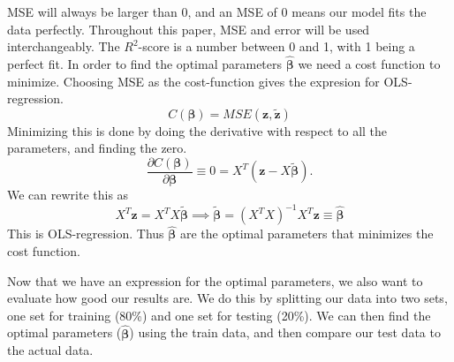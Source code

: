 \documentclass[reprint,english,notitlepage,aps,nobalancelastpage,nofootinbib]{revtex4-1}  %
\newcommand{\vc}[1]{\mathbf{#1}}
\begin{document}
MSE will always be larger than 0, and an MSE of 0 means our model fits the data perfectly. Throughout this paper, MSE and error will be used interchangeably. The $R^2$-score is a number between 0 and 1, with 1 being a perfect fit. In order to find the optimal parameters $\boldsymbol{\hat{\beta}}$ we need a cost function to minimize. Choosing MSE as the cost-function gives the expresion for OLS-regression.
\begin{equation*}
	C(\boldsymbol{\beta}) = MSE(\boldsymbol{z}, \boldsymbol{\tilde{z}})
\end{equation*}
Minimizing this is done by doing the derivative with respect to all the parameters, and finding the zero.
\begin{equation}\label{eq:Const_OLS}
	\frac{\partial C(\boldsymbol{\beta})}{\partial \boldsymbol{\beta}} \equiv 0 = X^T(\boldsymbol{z} - X\boldsymbol{\tilde{\beta}}).
\end{equation}
We can rewrite this as
\begin{equation}\label{eq:OLS_beta}
	X^T\vc{z} = X^TX\boldsymbol{\tilde{\beta}} \implies \boldsymbol{\tilde{\beta}} = (X^TX)^{-1} X^T \vc{z} \equiv \boldsymbol{\hat{\beta}}
\end{equation}
This is OLS-regression. Thus $\boldsymbol{\hat{\beta}}$ are the optimal parameters that minimizes the cost function.

Now that we have an expression for the optimal parameters, we also want to evaluate how good our results are. We do this by splitting our data into two sets, one set for training (80\%) and one set for testing (20\%). We can then find the optimal parameters ($\boldsymbol{\hat{\beta}}$) using the train data, and then compare our test data to the actual data.

\end{document}
